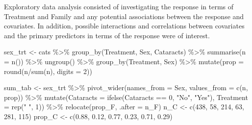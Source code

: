 \documentclass[
]{article}
\newenvironment{Shaded}{\begin{snugshade}}{\end{snugshade}}
\newcommand{\AttributeTok}[1]{\textcolor[rgb]{0.77,0.63,0.00}{#1}}
\newcommand{\DecValTok}[1]{\textcolor[rgb]{0.00,0.00,0.81}{#1}}
\newcommand{\FloatTok}[1]{\textcolor[rgb]{0.00,0.00,0.81}{#1}}
\newcommand{\FunctionTok}[1]{\textcolor[rgb]{0.00,0.00,0.00}{#1}}
\newcommand{\NormalTok}[1]{#1}
\newcommand{\OtherTok}[1]{\textcolor[rgb]{0.56,0.35,0.01}{#1}}
\newcommand{\SpecialCharTok}[1]{\textcolor[rgb]{0.00,0.00,0.00}{#1}}
\newcommand{\StringTok}[1]{\textcolor[rgb]{0.31,0.60,0.02}{#1}}
\begin{document}
Exploratory data analysis consisted of investigating the response in
terms of Treatment and Family and any potential associations between the
response and covariates. In addition, possible interactions and
correlations between covariates and the primary predictors in terms of
the response were of interest.

\begin{Shaded}
\begin{Highlighting}[]
\NormalTok{sex\_trt }\OtherTok{\textless{}{-}}\NormalTok{ cats }\SpecialCharTok{\%\textgreater{}\%}
  \FunctionTok{group\_by}\NormalTok{(Treatment, Sex, Cataracts) }\SpecialCharTok{\%\textgreater{}\%}
  \FunctionTok{summarise}\NormalTok{(}\AttributeTok{n =} \FunctionTok{n}\NormalTok{()) }\SpecialCharTok{\%\textgreater{}\%}
  \FunctionTok{ungroup}\NormalTok{() }\SpecialCharTok{\%\textgreater{}\%}
  \FunctionTok{group\_by}\NormalTok{(Treatment, Sex) }\SpecialCharTok{\%\textgreater{}\%}
  \FunctionTok{mutate}\NormalTok{(}\AttributeTok{prop =} \FunctionTok{round}\NormalTok{(n}\SpecialCharTok{/}\FunctionTok{sum}\NormalTok{(n), }\AttributeTok{digits =} \DecValTok{2}\NormalTok{))}

\NormalTok{sum\_tab }\OtherTok{\textless{}{-}}\NormalTok{ sex\_trt }\SpecialCharTok{\%\textgreater{}\%}
  \FunctionTok{pivot\_wider}\NormalTok{(}\AttributeTok{names\_from =}\NormalTok{ Sex, }\AttributeTok{values\_from =} \FunctionTok{c}\NormalTok{(n, prop)) }\SpecialCharTok{\%\textgreater{}\%}
  \FunctionTok{mutate}\NormalTok{(}\AttributeTok{Cataracts =} \FunctionTok{ifelse}\NormalTok{(Cataracts }\SpecialCharTok{==} \DecValTok{0}\NormalTok{, }\StringTok{"No"}\NormalTok{, }\StringTok{"Yes"}\NormalTok{),}
         \AttributeTok{Treatment =} \FunctionTok{rep}\NormalTok{(}\StringTok{" "}\NormalTok{, }\DecValTok{1}\NormalTok{)) }\SpecialCharTok{\%\textgreater{}\%}
  \FunctionTok{relocate}\NormalTok{(prop\_F, }\AttributeTok{.after =}\NormalTok{ n\_F)}
\NormalTok{n\_C }\OtherTok{\textless{}{-}} \FunctionTok{c}\NormalTok{(}\DecValTok{438}\NormalTok{, }\DecValTok{58}\NormalTok{, }\DecValTok{214}\NormalTok{, }\DecValTok{63}\NormalTok{, }\DecValTok{281}\NormalTok{, }\DecValTok{115}\NormalTok{)}
\NormalTok{prop\_C }\OtherTok{\textless{}{-}} \FunctionTok{c}\NormalTok{(}\FloatTok{0.88}\NormalTok{, }\FloatTok{0.12}\NormalTok{, }\FloatTok{0.77}\NormalTok{, }\FloatTok{0.23}\NormalTok{, }\FloatTok{0.71}\NormalTok{, }\FloatTok{0.29}\NormalTok{)}


\end{Highlighting}
\end{Shaded}
\end{document}
